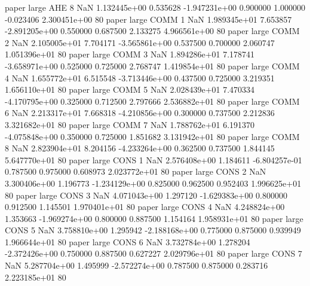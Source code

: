             paper      large      AHE                 8                  NaN 1.132445e+00      0.535628 -1.947231e+00 0.900000 1.000000      -0.023406 2.300451e+00 80
            paper      large     COMM                 1                  NaN 1.989345e+01      7.653857 -2.891205e+00 0.550000 0.687500       2.133275 4.966561e+00 80
            paper      large     COMM                 2                  NaN 2.105005e+01      7.704171 -3.565861e+00 0.537500 0.700000       2.060747 1.051396e+01 80
            paper      large     COMM                 3                  NaN 1.894286e+01      7.178741 -3.658971e+00 0.525000 0.725000       2.768747 1.419854e+01 80
            paper      large     COMM                 4                  NaN 1.655772e+01      6.515548 -3.713446e+00 0.437500 0.725000       3.219351 1.656110e+01 80
            paper      large     COMM                 5                  NaN 2.028439e+01      7.470334 -4.170795e+00 0.325000 0.712500       2.797666 2.536882e+01 80
            paper      large     COMM                 6                  NaN 2.213317e+01      7.668318 -4.210856e+00 0.300000 0.737500       2.212836 3.321682e+01 80
            paper      large     COMM                 7                  NaN 1.788762e+01      6.191370 -4.075848e+00 0.350000 0.725000       1.851682 3.131942e+01 80
            paper      large     COMM                 8                  NaN 2.823904e+01      8.204156 -4.233264e+00 0.362500 0.737500       1.844145 5.647770e+01 80
            paper      large     CONS                 1                  NaN 2.576408e+00      1.184611 -6.804257e-01 0.787500 0.975000       0.608973 2.023772e+01 80
            paper      large     CONS                 2                  NaN 3.300406e+00      1.196773 -1.234129e+00 0.825000 0.962500       0.952403 1.996625e+01 80
            paper      large     CONS                 3                  NaN 4.071043e+00      1.297120 -1.629383e+00 0.800000 0.912500       1.145501 1.970401e+01 80
            paper      large     CONS                 4                  NaN 4.248824e+00      1.353663 -1.969274e+00 0.800000 0.887500       1.154164 1.958931e+01 80
            paper      large     CONS                 5                  NaN 3.758810e+00      1.295942 -2.188168e+00 0.775000 0.875000       0.939949 1.966644e+01 80
            paper      large     CONS                 6                  NaN 3.732784e+00      1.278204 -2.372426e+00 0.750000 0.887500       0.627227 2.029796e+01 80
            paper      large     CONS                 7                  NaN 5.287704e+00      1.495999 -2.572274e+00 0.787500 0.875000       0.283716 2.223185e+01 80
